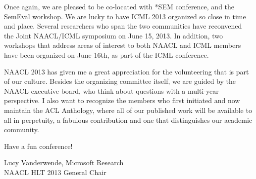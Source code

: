 \begin{large}
Once again, we are pleased to be co-located with *SEM conference, and the SemEval workshop. We are lucky to have ICML 2013 organized  so  close  in time and place.  Several  researchers who span the two communities have reconvened the Joint NAACL/ICML symposium on June  15, 2013. In addition, two workshops that address areas of interest to both NAACL and ICML members have been organized on June 16th, as part of the ICML conference.

NAACL 2013 has given me a great appreciation for the volunteering that is part of our culture. Besides the organizing committee itself, we are guided by the NAACL executive board, who think about questions with a multi-year perspective. I also want to recognize the members who first initiated and now maintain the ACL Anthology, where all of our published work will be available to all in perpetuity, a fabulous contribution and one that distinguishes our academic community.

Have a fun conference!

\vspace{.2in}
Lucy Vanderwende, Microsoft Research \\
\indent NAACL HLT 2013 General Chair
\end{large}
